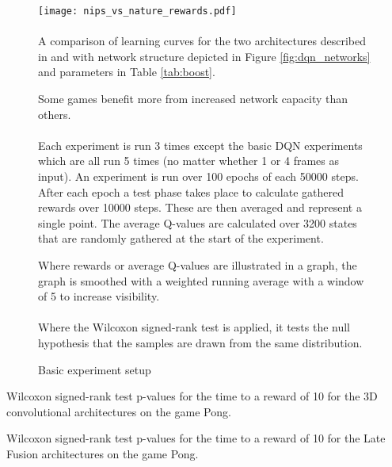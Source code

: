 \begin{figure}[htpb]
  \centering
  \texttt{[image: nips\_vs\_nature\_rewards.pdf]}
  \raggedright
  \paragraph{}
    A comparison of learning curves for the two architectures described in
    \cite{Mnih2013} and \cite{Mnih2015}
    with network structure depicted in Figure \ref{fig:dqn_networks}
    and parameters in Table \ref{tab:boost}.

    Some games benefit more from increased network capacity than others.
  \label{fig:nips_vs_nature_rewards}
\end{figure}

\begin{figure}[]
  \paragraph{}
  Each experiment is run 3 times
  except the basic DQN experiments which are all run 5 times
  (no matter whether 1 or 4 frames as input).
  An experiment is run over 100 epochs of each 50000 steps.
  After each epoch a test phase takes place to calculate gathered rewards
  over 10000 steps.
  These are then averaged and represent a single point.
  The average Q-values are calculated over 3200 states
  that are randomly gathered at the start of the experiment.

  Where rewards or average Q-values are illustrated in a graph,
  the graph is smoothed with a weighted running average
  with a window of 5
  to increase visibility.

  \paragraph{}
  Where the Wilcoxon signed-rank test is applied,
  it tests the null hypothesis that the samples
  are drawn from the same distribution.

  \caption{Basic experiment setup}
  \label{fig:basic_setup}
\end{figure}

\begin{table}
  \center
  \renewcommand{\arraystretch}{1.3}
  
  \caption{
    Wilcoxon signed-rank test p-values
    for the time to a reward of 10
    for the 3D convolutional architectures
    on the game Pong.
  }
  \label{tab:conv3d_wilcoxon}
\end{table}


\begin{table}
  \center
  \renewcommand{\arraystretch}{1.3}
  
  \caption{
    Wilcoxon signed-rank test p-values
    for the time to a reward of 10
    for the Late Fusion architectures
    on the game Pong.
  }
  \label{tab:lf_wilcoxon}
\end{table}
